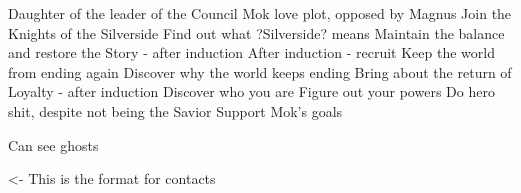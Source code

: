 \documentclass[char]{Silversiders}
\begin{document}
\name{\cTruth{}}

Daughter of the leader of the Council
Mok love plot, opposed by Magnus
Join the Knights of the Silverside
Find out what ?Silverside? means
Maintain the balance and restore the Story - after induction
After induction - recruit
Keep the world from ending again
Discover why the world keeps ending
Bring about the return of Loyalty - after induction
Discover who you are
Figure out your powers
Do hero shit, despite not being the Savior
Support Mok's goals

Can see ghosts

\begin{itemz}[Goals]
	\item 
\end{itemz}

\begin{itemz}[Notes]
	\item 
\end{itemz}

\begin{contacts}
	\contact{\cTest{}} <- This is the format for contacts 
\end{contacts}
\end{document}
